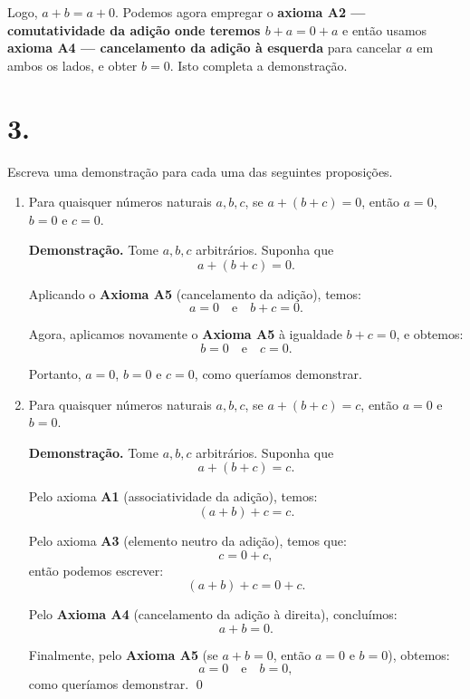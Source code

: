 \documentclass[12pt,a4paper]{article}
\begin{document}
\begin{enumerate}[label=(\alph*)]
    Logo, $a + b = a + 0$.  
    Podemos agora empregar o \textbf{axioma A2 — comutatividade da adição onde teremos $b + a = 0 + a$} e então usamos \textbf{axioma A4 — cancelamento da adição à esquerda} para cancelar $a$ em ambos os lados, e obter $b = 0$.  
    Isto completa a demonstração.
    
    \section*{3.}
    Escreva uma demonstração para cada uma das seguintes proposições.
    
    \begin{enumerate}[label=(\alph*)]
        \item Para quaisquer números naturais $a, b, c$, se $a + (b + c) = 0$, então $a = 0$, $b = 0$ e $c = 0$.

        \textbf{Demonstração.} Tome $a, b, c$ arbitrários. Suponha que
        \[
        a + (b + c) = 0.
        \]
        
        Aplicando o \textbf{Axioma A5} (cancelamento da adição), temos:
        \[
        a = 0 \quad \text{e} \quad b + c = 0.
        \]
        
        Agora, aplicamos novamente o \textbf{Axioma A5} à igualdade $b + c = 0$, e obtemos:
        \[
        b = 0 \quad \text{e} \quad c = 0.
        \]
        
        Portanto, $a = 0$, $b = 0$ e $c = 0$, como queríamos demonstrar.
        
        \item Para quaisquer números naturais $a, b, c$, se $a + (b + c) = c$, então $a = 0$ e $b = 0$.

        \textbf{Demonstração.} Tome $a, b, c$ arbitrários. Suponha que
        \[
        a + (b + c) = c.
        \]
        
        Pelo axioma \textbf{A1} (associatividade da adição), temos:
        \[
        (a + b) + c = c.
        \]
        
        Pelo axioma \textbf{A3} (elemento neutro da adição), temos que:
        \[
        c = 0 + c,
        \]
        então podemos escrever:
        \[
        (a + b) + c = 0 + c.
        \]
        
        Pelo \textbf{Axioma A4} (cancelamento da adição à direita), concluímos:
        \[
        a + b = 0.
        \]
        
        Finalmente, pelo \textbf{Axioma A5} (se $a + b = 0$, então $a = 0$ e $b = 0$), obtemos:
        \[
        a = 0 \quad \text{e} \quad b = 0,
        \]
        como queríamos demonstrar. \qed
        

\end{enumerate}
\end{enumerate}
\end{document}
